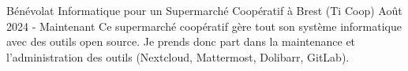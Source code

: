 Bénévolat Informatique pour un Supermarché Coopératif à Brest (Ti Coop)
Août 2024 - Maintenant
Ce supermarché coopératif gère tout son système informatique avec des outils open source. Je prends donc part dans la maintenance et l'administration des outils (Nextcloud, Mattermost, Dolibarr, GitLab).